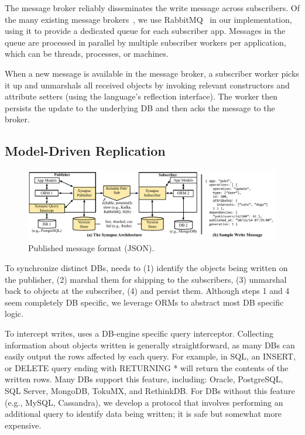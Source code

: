 The message broker reliably disseminates the write message across subscribers.
Of the many existing message brokers~\cite{jms,kafka,rabbitmq},
we use RabbitMQ~\cite{rabbitmq} in our implementation, using it to provide a
dedicated queue for each subscriber app. Messages in the queue are processed in
parallel by multiple subscriber workers per application, which can be threads,
processes, or machines.

When a new message is available in the message broker, a \synapse subscriber
worker picks it up and unmarshals all received objects by invoking relevant
constructors and attribute setters (using the language's reflection interface).
The worker then persists the update to the underlying DB and then acks the
message to the broker.


\subsection{Model-Driven Replication}
\label{sec:arch:cross-db-propagation}


\begin{figure}[t]
 \centering
 \includegraphics[width=.45\linewidth,clip=true,trim=5in 0.4in 0 0]{figures/synapse/architecture-less-detail.pdf}
 \caption{{Published message format (JSON).}}
 \label{fig:architecture}
\end{figure}


To synchronize distinct DBs, \synapse needs to (1) identify the objects being
written on the publisher, (2) marshal them for shipping to the subscribers, (3)
unmarshal back to objects at the subscriber, (4) and persist them.
Although steps 1 and 4 seem completely DB specific, we leverage ORMs to abstract most DB specific logic.

To intercept writes, \synapse uses a DB-engine specific query interceptor.
Collecting information about objects written is
generally straightforward, as many DBs can easily output the rows affected
by each query. For example, in SQL, an {\code INSERT}, or {\code DELETE}
query ending with {\code RETURNING *} will return the contents of the
written rows. Many DBs support this feature, including: Oracle, PostgreSQL, SQL
Server, MongoDB, TokuMX, and RethinkDB. For DBs without this feature
(e.g., MySQL, Cassandra), we develop a protocol that involves performing an additional
query to identify data being written; it is safe but somewhat more expensive.


